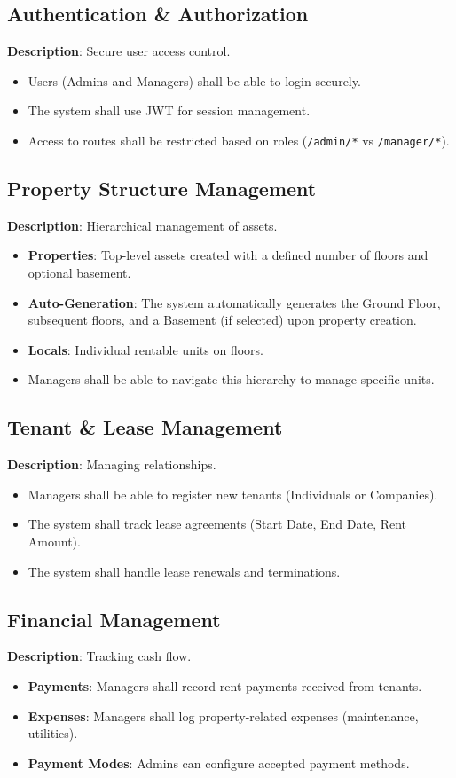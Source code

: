 \documentclass[12pt,a4paper]{article}
\begin{document}
\subsection{Authentication \& Authorization}
\textbf{Description}: Secure user access control.
\begin{itemize}
    \item Users (Admins and Managers) shall be able to login securely.
    \item The system shall use JWT for session management.
    \item Access to routes shall be restricted based on roles (\texttt{/admin/*} vs \texttt{/manager/*}).
\end{itemize}

\subsection{Property Structure Management}
\textbf{Description}: Hierarchical management of assets.
\begin{itemize}
    \item \textbf{Properties}: Top-level assets created with a defined number of floors and optional basement.
    \item \textbf{Auto-Generation}: The system automatically generates the Ground Floor, subsequent floors, and a Basement (if selected) upon property creation.
    \item \textbf{Locals}: Individual rentable units on floors.
    \item Managers shall be able to navigate this hierarchy to manage specific units.
\end{itemize}

\subsection{Tenant \& Lease Management}
\textbf{Description}: Managing relationships.
\begin{itemize}
    \item Managers shall be able to register new tenants (Individuals or Companies).
    \item The system shall track lease agreements (Start Date, End Date, Rent Amount).
    \item The system shall handle lease renewals and terminations.
\end{itemize}

\subsection{Financial Management}
\textbf{Description}: Tracking cash flow.
\begin{itemize}
    \item \textbf{Payments}: Managers shall record rent payments received from tenants.
    \item \textbf{Expenses}: Managers shall log property-related expenses (maintenance, utilities).
    \item \textbf{Payment Modes}: Admins can configure accepted payment methods.
\end{itemize}
\end{document}
